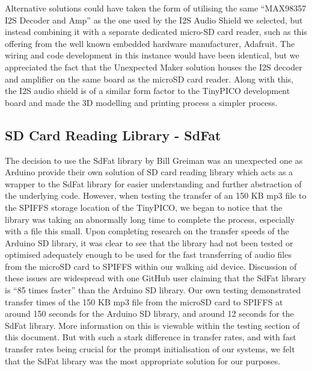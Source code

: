             Alternative solutions could have taken the form of utilising the same ``MAX98357 I2S Decoder and Amp'' \cite{unexpected_maker} as the one used by the I2S Audio Shield we selected, but instead combining it with a separate dedicated micro-SD card reader, such as this offering \cite{ada_2022} from the well known embedded hardware manufacturer, Adafruit. The wiring and code development in this instance would have been identical, but we appreciated the fact that the Unexpected Maker solution houses the I2S decoder and amplifier on the same board as the microSD card reader. Along with this, the I2S audio shield is of a similar form factor to the TinyPICO development board and made the 3D modelling and printing process a simpler process.

        \subsection{SD Card Reading Library - SdFat}
        \label{subsec:sdfat}

            The decision to use the SdFat library by Bill Greiman \cite{greiman} was an unexpected one as Arduino provide their own solution of SD card reading library \cite{arduino} which acts as a wrapper to the SdFat library for easier understanding and further abstraction of the underlying code. However, when testing the transfer of an 150 KB mp3 file to the SPIFFS storage location of the TinyPICO, we began to notice that the library was taking an abnormally long time to complete the process, especially with a file this small. Upon completing research on the transfer speeds of the Arduino SD library, it was clear to see that the library had not been tested or optimised adequately enough to be used for the fast transferring of audio files from the microSD card to SPIFFS within our walking aid device. Discussion of these issues are widespread \cite{fat16lib_2011,drdooom_2019} with one GitHub user claiming that the SdFat library is ``85 times faster'' \cite{kas2_2018} than the Arduino SD library. Our own testing demonstrated transfer times of the 150 KB mp3 file from the microSD card to SPIFFS at around 150 seconds for the Arduino SD library, and around 12 seconds for the SdFat library. More information on this is viewable within the testing section of this document. But with such a stark difference in transfer rates, and with fast transfer rates being crucial for the prompt initialisation of our systems, we felt that the SdFat library was the most appropriate solution for our purposes.

